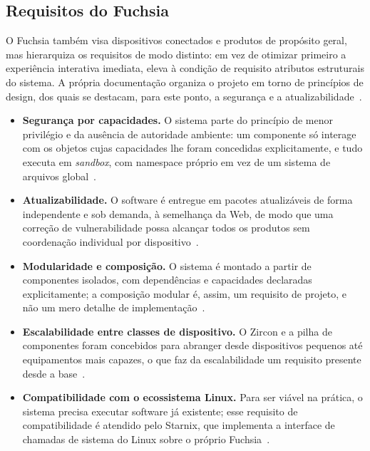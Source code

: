 \documentclass[12pt,a4paper]{article}
\begin{document}
\subsection{Requisitos do Fuchsia}

O Fuchsia também visa dispositivos conectados e produtos de propósito geral, mas
hierarquiza os requisitos de modo distinto: em vez de otimizar primeiro a
experiência interativa imediata, eleva à condição de requisito atributos
estruturais do sistema. A própria documentação organiza o projeto em torno de
princípios de design, dos quais se destacam, para este ponto, a segurança e a
atualizabilidade~\cite{fuchsia_secure,fuchsia_updatable}.

\begin{itemize}[leftmargin=*]
  \item \textbf{Segurança por capacidades.} O sistema parte do princípio de menor
    privilégio e da ausência de autoridade ambiente: um componente só interage com
    os objetos cujas capacidades lhe foram concedidas explicitamente, e tudo executa
    em \emph{sandbox}, com namespace próprio em vez de um sistema de arquivos
    global~\cite{fuchsia_secure,zircon}.

  \item \textbf{Atualizabilidade.} O software é entregue em pacotes atualizáveis de
    forma independente e sob demanda, à semelhança da Web, de modo que uma correção
    de vulnerabilidade possa alcançar todos os produtos sem coordenação individual
    por dispositivo~\cite{fuchsia_updatable}.

  \item \textbf{Modularidade e composição.} O sistema é montado a partir de
    componentes isolados, com dependências e capacidades declaradas explicitamente;
    a composição modular é, assim, um requisito de projeto, e não um mero detalhe de
    implementação~\cite{fuchsia_components}.

  \item \textbf{Escalabilidade entre classes de dispositivo.} O Zircon e a pilha de
    componentes foram concebidos para abranger desde dispositivos pequenos até
    equipamentos mais capazes, o que faz da escalabilidade um requisito presente
    desde a base~\cite{fuchsiadev,zircon}.

  \item \textbf{Compatibilidade com o ecossistema Linux.} Para ser viável na
    prática, o sistema precisa executar software já existente; esse requisito de
    compatibilidade é atendido pelo Starnix, que implementa a interface de chamadas
    de sistema do Linux sobre o próprio Fuchsia~\cite{starnix}.
\end{itemize}
\end{document}
